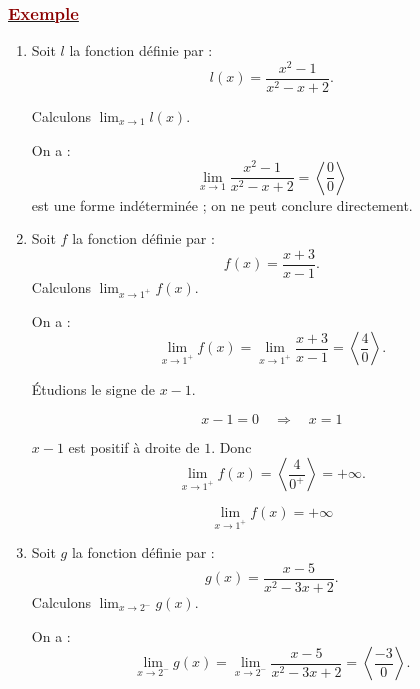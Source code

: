 \documentclass[12pt,a4paper]{article}
\begin{document}
\subsubsection*{\underline{\textcolor{darkred}{ Exemple }}} 
\begin{enumerate}

    \item Soit \(l\) la fonction définie par :
    \[
        l(x)=\frac{x^2-1}{x^2-x+2}.
    \]
    
    Calculons \(\displaystyle\lim_{x\to1}l(x)\).

    On a :
    \[
        \lim_{x\to1}\frac{x^2-1}{x^2-x+2}
        =\left\langle\frac{0}{0}\right\rangle
    \]
    est une forme indéterminée ; on ne peut conclure directement.

    \bigskip

    \item Soit \(f\) la fonction définie par :
    \[
        f(x)=\frac{x+3}{x-1}.
    \]
    Calculons \(\displaystyle\lim_{x\to1^+}f(x)\).

    On a :
    \[
        \lim_{x\to1^+}f(x)
        =
        \lim_{x\to1^+}\frac{x+3}{x-1}
        =
        \left\langle\frac{4}{0}\right\rangle.
    \]

    Étudions le signe de \(x-1\).

    \[
        x-1=0\quad\Longrightarrow\quad x=1
    \]

\begin{center}
\end{center}

    \(x-1\) est positif à droite de \(1\). Donc
    \[
        \lim_{x\to1^+}f(x)
        =
        \left\langle\frac{4}{0^+}\right\rangle
        =+\infty.
    \]

    \[
        \boxed{\displaystyle\lim_{x\to1^+}f(x)=+\infty}
    \]

    \bigskip

    \item Soit \(g\) la fonction définie par :
    \[
        g(x)=\frac{x-5}{x^2-3x+2}.
    \]
    Calculons \(\displaystyle\lim_{x\to2^-}g(x)\).

    On a :
    \[
        \lim_{x\to2^-}g(x)
        =
        \lim_{x\to2^-}\frac{x-5}{x^2-3x+2}
        =
        \left\langle\frac{-3}{0}\right\rangle.
    \]


\end{enumerate}
\end{document}

